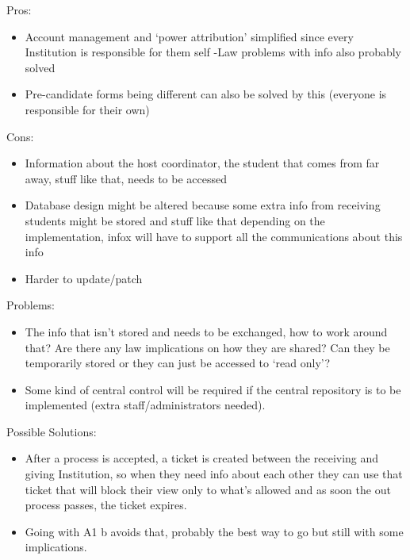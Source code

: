 Pros:
\begin{itemize}
\item Account management and ‘power attribution’ simplified since every Institution
is responsible for them self -Law problems with info also probably solved
\item Pre-candidate forms being different can also be solved by this (everyone
is responsible for their own)
\end{itemize}

Cons:
\begin{itemize}
\item Information about the host coordinator, the student that comes from far away,
stuff like that, needs to be accessed
\item Database design might be altered because some extra info from receiving
students might be stored and stuff like that depending on the implementation,
infox will have to support all the communications about this info 
\item Harder to update/patch
\end{itemize}

Problems:
\begin{itemize}
  \item The info that isn't stored and needs to be exchanged, how to work around
  that? Are there any law implications on how they are shared? Can they be temporarily
stored or they can just be accessed to ‘read only’? 
\item Some kind of central control will be required if the central repository is to
be implemented (extra staff/administrators needed).
\end{itemize}

Possible Solutions:
\begin{itemize}
  \item After a process is accepted, a ticket is created between the receiving and
giving Institution, so when they need info about each other they can use that
ticket that will block their view only to what’s allowed and as soon the out
process passes, the ticket expires.
\item Going with A1 b avoids that, probably the best way to go but still with some
implications.
\end{itemize}
